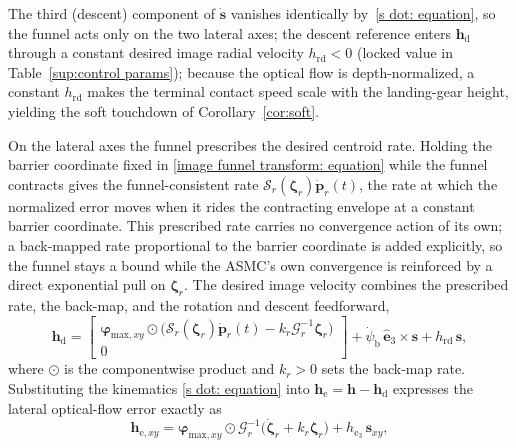 \documentclass{IEEEtaes}
\theoremstyle{definition}
\theoremstyle{remark}
\begin{document}
The third (descent) component of $\dot{\boldsymbol{s}}$ vanishes identically by~\eqref{s dot: equation}, so the funnel acts only on the two lateral axes; the descent reference enters $\boldsymbol{h}_\text{d}$ through a constant desired image radial velocity $h_\text{rd}<0$ (locked value in Table~\ref{sup:control params}); because the optical flow is depth-normalized, a constant $h_\text{rd}$ makes the terminal contact speed scale with the landing-gear height, yielding the soft touchdown of Corollary~\ref{cor:soft}.

On the lateral axes the funnel prescribes the desired centroid rate. Holding the barrier coordinate fixed in \eqref{image funnel transform: equation} while the funnel contracts gives the funnel-consistent rate $\mathcal{S}_r(\boldsymbol{\zeta}_r)\dot{\boldsymbol{p}}_r(t)$, the rate at which the normalized error moves when it rides the contracting envelope at a constant barrier coordinate. This prescribed rate carries no convergence action of its own; a back-mapped rate proportional to the barrier coordinate is added explicitly, so the funnel stays a bound while the ASMC's own convergence is reinforced by a direct exponential pull on $\boldsymbol{\zeta}_r$. The desired image velocity combines the prescribed rate, the back-map, and the rotation and descent feedforward,
\begin{equation} \label{h_d final: equation}
    \boldsymbol{h}_\text{d} = \begin{bmatrix}\boldsymbol{\varphi}_{\text{max},xy}\odot\big(\mathcal{S}_r(\boldsymbol{\zeta}_r)\dot{\boldsymbol{p}}_r(t)-k_r\mathcal{G}_r^{-1}\boldsymbol{\zeta}_r\big)\\ 0\end{bmatrix} + \dot{\psi}_\text{b}\,\hat{\boldsymbol{e}}_3\times\boldsymbol{s} + h_\text{rd}\,\boldsymbol{s},
\end{equation}
where $\odot$ is the componentwise product and $k_r>0$ sets the back-map rate. Substituting the kinematics \eqref{s dot: equation} into $\boldsymbol{h}_\text{e}=\boldsymbol{h}-\boldsymbol{h}_\text{d}$ expresses the lateral optical-flow error exactly as
\begin{equation} \label{h_e identity: equation}
    \boldsymbol{h}_{\text{e},xy} = \boldsymbol{\varphi}_{\text{max},xy}\odot\mathcal{G}_r^{-1}\big(\dot{\boldsymbol{\zeta}}_r+k_r\boldsymbol{\zeta}_r\big) + h_{\text{e}_3}\,\boldsymbol{s}_{xy},
\end{equation}
\end{document}
